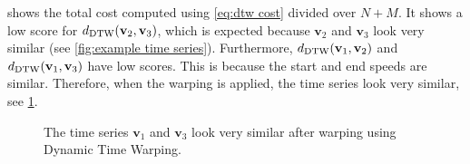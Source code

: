 \documentclass[10pt,final,a4paper,oneside,onecolumn]{article}
\newlength\figurewidth
\newlength\figureheight
\newcommand{\ddtw}{d_{\textup{DTW}}}
\newcommand{\profile}[1]{\textbf{v}_{#1}}
\theoremstyle{plain}\newtheorem{definition}{Definition}[section]    %
\theoremstyle{definition}\newtheorem{example}{Example}[section]     %
\theoremstyle{remark}\newtheorem{remarkenv}{Remark}[section]        %
\begin{document}
 shows the total cost computed using \cref{eq:dtw cost} divided over $N+M$. It shows a low score for $\ddtw(\profile{2}, \profile{3})$, which is expected because $\profile{2}$ and $\profile{3}$ look very similar (see \cref{fig:example time series}). Furthermore, $\ddtw(\profile{1}, \profile{2})$ and $\ddtw(\profile{1}, \profile{3})$ have low scores. This is because the start and end speeds are similar. Therefore, when the warping is applied, the time series look very similar, see \cref{fig:example dtw}.

\begin{figure}
	\centering
	\setlength{}
	\setlength{}
	
	\caption{The time series $\profile{1}$ and $\profile{3}$ look very similar after warping using Dynamic Time Warping.}
	\label{fig:example dtw}
\end{figure}


\printbibliography
\end{document}
